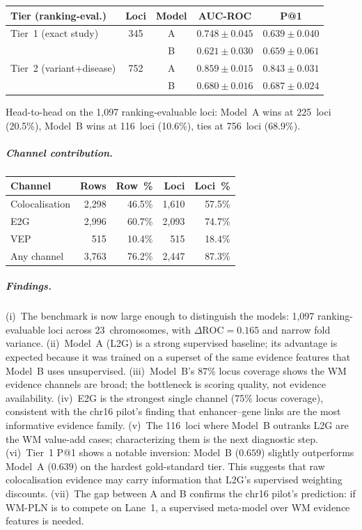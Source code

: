 \documentclass[11pt,openany]{report}
\begin{document}
\begin{center}
\small
\begin{tabular}{@{}lcccc@{}}
\toprule
\textbf{Tier (ranking-eval.)} & \textbf{Loci}
  & \textbf{Model} & \textbf{AUC-ROC} & \textbf{P@1} \\
\midrule
Tier~1 (exact study)   & 345 & A & $0.748 \pm 0.045$ & $0.639 \pm 0.040$ \\
                       &     & B & $0.621 \pm 0.030$ & $0.659 \pm 0.061$ \\
\midrule
Tier~2 (variant+disease) & 752 & A & $0.859 \pm 0.015$ & $0.843 \pm 0.031$ \\
                         &     & B & $0.680 \pm 0.016$ & $0.687 \pm 0.024$ \\
\bottomrule
\end{tabular}
\end{center}

\noindent
Head-to-head on the 1,097 ranking-evaluable loci:
Model~A wins at 225~loci (20.5\%),
Model~B wins at 116~loci (10.6\%),
ties at 756~loci (68.9\%).

\subparagraph{Channel contribution.}

\begin{center}
\small
\begin{tabular}{@{}lrrrr@{}}
\toprule
\textbf{Channel} & \textbf{Rows} & \textbf{Row~\%}
  & \textbf{Loci} & \textbf{Loci~\%} \\
\midrule
Colocalisation & 2{,}298 & 46.5\% & 1{,}610 & 57.5\% \\
E2G            & 2{,}996 & 60.7\% & 2{,}093 & 74.7\% \\
VEP            &    515  & 10.4\% &    515  & 18.4\% \\
Any channel    & 3{,}763 & 76.2\% & 2{,}447 & 87.3\% \\
\bottomrule
\end{tabular}
\end{center}

\subparagraph{Findings.}
(i)~The benchmark is now large enough to distinguish the models:
1,097 ranking-evaluable loci across 23~chromosomes, with
$\Delta\text{ROC} = 0.165$ and narrow fold variance.
(ii)~Model~A (L2G) is a strong supervised baseline; its advantage
is expected because it was trained on a superset of the same
evidence features that Model~B uses unsupervised.
(iii)~Model~B's 87\% locus coverage shows the WM evidence channels
are broad; the bottleneck is scoring quality, not evidence
availability.
(iv)~E2G is the strongest single channel (75\% locus coverage),
consistent with the chr16 pilot's finding that enhancer--gene
links are the most informative evidence family.
(v)~The 116~loci where Model~B outranks L2G are the WM value-add
cases; characterizing them is the next diagnostic step.
(vi)~Tier~1 P@1 shows a notable inversion: Model~B ($0.659$) slightly
outperforms Model~A ($0.639$) on the hardest gold-standard tier.
This suggests that raw colocalisation evidence may carry information
that L2G's supervised weighting discounts.
(vii)~The gap between A and B confirms the chr16 pilot's prediction:
if WM-PLN is to compete on Lane~1, a supervised meta-model over
WM evidence features is needed.
\end{document}
